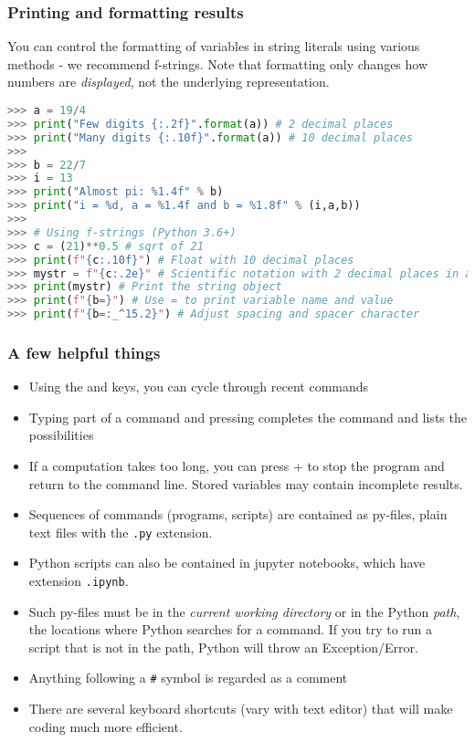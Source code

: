 \begin{frame}[fragile]
  \frametitle{Printing and formatting results}
  You can control the formatting of variables in string literals using various methods - we recommend f-strings. Note that formatting only changes how numbers are \emph{displayed}, not the underlying representation.

  \begin{lstlisting}[language=Python,numbers=none]
>>> a = 19/4
>>> print("Few digits {:.2f}".format(a)) # 2 decimal places
>>> print("Many digits {:.10f}".format(a)) # 10 decimal places
>>> 
>>> b = 22/7
>>> i = 13
>>> print("Almost pi: %1.4f" % b)
>>> print("i = %d, a = %1.4f and b = %1.8f" % (i,a,b))
>>>
>>> # Using f-strings (Python 3.6+)
>>> c = (21)**0.5 # sqrt of 21
>>> print(f"{c:.10f}") # Float with 10 decimal places
>>> mystr = f"{c:.2e}" # Scientific notation with 2 decimal places in a string object
>>> print(mystr) # Print the string object
>>> print(f"{b=}") # Use = to print variable name and value
>>> print(f"{b=:_^15.2}") # Adjust spacing and spacer character
  \end{lstlisting}
\end{frame}
 
 {\nologo
 \begin{frame}[fragile]
  \frametitle{A few helpful things}
  \begin{itemize}[<+->]
    \item Using the \keystroke{$\uparrow$} and \keystroke{$\downarrow$} keys, you can cycle through recent commands
    \item Typing part of a command and pressing  completes the command and lists the possibilities
    \item If a computation takes too long, you can press + to stop the program and return to the command line. Stored variables may contain incomplete results.
    \item Sequences of commands (programs, scripts) are contained as py-files, plain text files with the \lstinline$.py$ extension.
    \item Python scripts can also be contained in jupyter notebooks, which have extension \lstinline$.ipynb$.
    \item Such py-files must be in the \emph{current working directory} or in the Python \emph{path}, the locations where Python searches for a command. If you try to run a script that is not in the path, Python will throw an Exception/Error.
    \item Anything following a \lstinline$#$ symbol is regarded as a comment
    \item There are several keyboard shortcuts (vary with text editor) that will make coding much more efficient.
  \end{itemize}
\end{frame}
}

